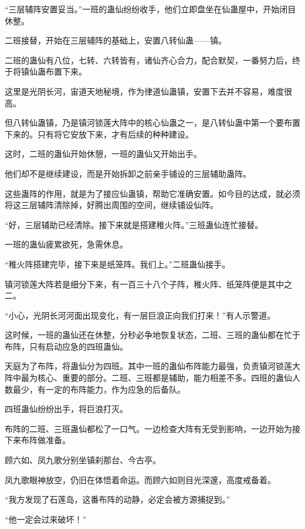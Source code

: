 
\begin{this_body}

“三层辅阵安置妥当。”一班的蛊仙纷纷收手，他们立即盘坐在仙蛊屋中，开始闭目休整。

二班接替，开始在三层辅阵的基础上，安置八转仙蛊——镇。

二班的蛊仙有八位，七转、六转皆有，诸仙齐心合力，配合默契，一番努力后，终于将镇仙蛊布置下来。

这里是光阴长河，宙道天地秘境，作为律道仙蛊镇，安置下去并不容易，难度很高。

但八转仙蛊镇，乃是镇河锁莲大阵中的核心仙蛊之一，是八转仙蛊中第一个要布置下来的。只有将它安放下来，才有后续的种种建设。

这时，二班的蛊仙开始休憩，一班的蛊仙又开始出手。

他们却不是继续建设，而是开始拆卸之前亲手铺设的三层辅助蛊阵。

这些蛊阵的作用，就是为了接应仙蛊镇，帮助它准确安置。如今目的达成，就必须将这三层辅阵清除掉，好腾出周围的空间，继续铺设仙阵。

“好，三层辅助已经清除。接下来就是搭建稚火阵。”三班蛊仙连忙接替。

一班的蛊仙疲累欲死，急需休息。

“稚火阵搭建完毕，接下来是纸笼阵。我们上。”二班蛊仙接手。

镇河锁莲大阵若是细分下来，有一百三十八个子阵，稚火阵、纸笼阵便是其中之二。

“小心，光阴长河河面出现变化，有一层巨浪正向我们打来！”有人示警道。

这时候，一班的蛊仙还在休整，分秒必争地恢复状态，二班、三班的蛊仙都在忙于布阵，只有启动应急的四班蛊仙。

天庭为了布阵，将蛊仙分为四班。其中一班的蛊仙布阵能力最强，负责镇河锁莲大阵中最为核心、重要的部分。二班、三班都是辅助，能力相差不多。四班的蛊仙人数最少，有一定的布阵能力，作为应急的后备队。

四班蛊仙纷纷出手，将巨浪打灭。

布阵的二班、三班蛊仙都松了一口气。一边检查大阵有无受到影响，一边开始为接下来布阵做准备。

顾六如、凤九歌分别坐镇刹那台、今古亭。

凤九歌眼神放空，仍旧在体悟着命运。而顾六如则目光深邃，高度戒备着。

“我方发现了石莲岛，这番布阵的动静，必定会被方源捕捉到。”

“他一定会过来破坏！”


\end{this_body}
